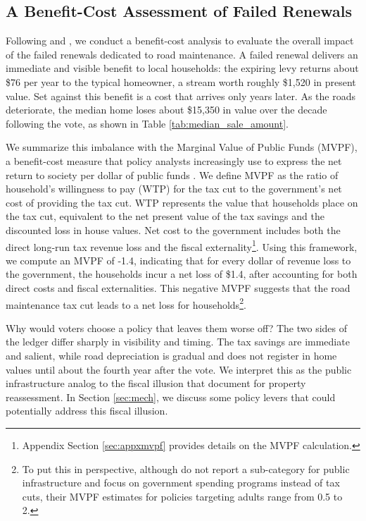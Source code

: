 ﻿\subsection{A Benefit-Cost Assessment of Failed Renewals} \label{sec:mvpf}

Following \cite{hendren2020unified} and \cite{finkelstein2020welfare}, we conduct a benefit-cost analysis to evaluate the overall impact of the failed renewals dedicated to road maintenance. A failed renewal delivers an immediate and visible benefit to local households: the expiring levy returns about \$76 per year to the typical homeowner, a stream worth roughly \$1,520 in present value. Set against this benefit is a cost that arrives only years later. As the roads deteriorate, the median home loses about \$15,350 in value over the decade following the vote, as shown in Table \ref{tab:median_sale_amount}.

We summarize this imbalance with the Marginal Value of Public Funds (MVPF), a benefit-cost measure that policy analysts increasingly use to express the net return to society per dollar of public funds \citep{hendren2020unified}. We define MVPF as the ratio of household's willingness to pay (WTP) for the tax cut to the government's net cost of providing the tax cut. WTP represents the value that households place on the tax cut, equivalent to the net present value of the tax savings and the discounted loss in house values. Net cost to the government includes both the direct long-run tax revenue loss and the fiscal externality\footnote{Appendix Section \ref{sec:appxmvpf} provides details on the MVPF calculation.}. Using this framework, we compute an MVPF of -1.4, indicating that for every dollar of revenue loss to the government, the households incur a net loss of \$1.4, after accounting for both direct costs and fiscal externalities. This negative MVPF suggests that the road maintenance tax cut leads to a net loss for households\footnote{To put this in perspective, although \cite{hendren2020unified} do not report a sub-category for public infrastructure and focus on government spending programs instead of tax cuts, their MVPF estimates for policies targeting adults range from 0.5 to 2.}.

Why would voters choose a policy that leaves them worse off? The two sides of the ledger differ sharply in visibility and timing. The tax savings are immediate and salient, while road depreciation is gradual and does not register in home values until about the fourth year after the vote.
We interpret this as the public infrastructure analog to the fiscal illusion that \citet{ross2013fiscal} document for property reassessment.
In Section \ref{sec:mech}, we discuss some policy levers that could potentially address this fiscal illusion.

